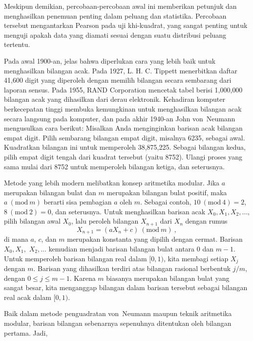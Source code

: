 Meskipun demikian, percobaan-percobaan awal ini memberikan petunjuk dan menghasilkan
penemuan penting dalam peluang dan statistika.  Percobaan tersebut mengantarkan Pearson pada \emx
{uji khi-kuadrat}, yang sangat penting untuk menguji apakah data
yang diamati sesuai dengan suatu distribusi peluang tertentu.

Pada awal 1900-an, jelas bahwa diperlukan cara yang lebih baik untuk menghasilkan bilangan acak.
Pada 1927, L. H. C. Tippett menerbitkan daftar 41{,}600 digit
yang diperoleh dengan memilih bilangan secara sembarang dari laporan sensus.  Pada 1955, RAND
Corporation mencetak tabel berisi 1{,}000{,}000 bilangan acak yang dihasilkan dari
derau elektronik.  Kehadiran komputer berkecepatan tinggi membuka
kemungkinan
untuk menghasilkan bilangan acak secara langsung pada komputer, dan pada akhir 1940-an
John von~Neumann mengusulkan cara berikut: Misalkan Anda menginginkan
barisan acak bilangan empat digit.  Pilih sembarang bilangan empat digit, misalnya
6235, sebagai awal.  Kuadratkan bilangan ini untuk memperoleh 38{,}875{,}225.  Sebagai bilangan
kedua, pilih empat digit tengah dari kuadrat tersebut (yaitu 8752).  Ulangi
proses yang sama mulai dari 8752 untuk memperoleh bilangan ketiga, dan seterusnya.  
\par
Metode yang lebih modern melibatkan
konsep aritmetika modular.  
Jika $a$ merupakan bilangan bulat dan $m$ merupakan bilangan bulat positif, maka
$a\ (\mbox{mod}\  m)$
berarti sisa pembagian $a$ oleh $m$.  Sebagai contoh, $10\ (
\mbox{mod}\  4) = 2$,
$8\ (\mbox{mod}\  2) = 0$, dan seterusnya.  Untuk menghasilkan barisan acak $X_0,
X_1, X_2,
\dots$, pilih bilangan awal $X_0$, lalu peroleh bilangan
$X_{n+1}$ dari $X_n$ dengan rumus 
$$X_{n+1} = (aX_n + c)\ (\mbox{mod}\ m)\ ,$$
di mana $a$, $c$, dan $m$ merupakan konstanta yang dipilih dengan cermat.  Barisan 
$ X_0,  X_1,$ 
$X_2, \dots$ 
kemudian menjadi barisan bilangan bulat antara 0 dan $m-1$.  Untuk memperoleh barisan bilangan real dalam $[0,1)$,
kita membagi setiap $X_j$ dengan $m$.  Barisan yang dihasilkan terdiri atas bilangan rasional berbentuk $j/m$,
dengan $0 \le j \le m-1$.  Karena $m$ biasanya merupakan bilangan bulat yang sangat besar, kita menganggap bilangan dalam barisan
tersebut sebagai bilangan real acak dalam $[0, 1)$.
\par
Baik dalam metode penguadratan von~Neumann maupun teknik aritmetika modular, barisan
bilangan sebenarnya sepenuhnya ditentukan oleh bilangan pertama.  Jadi,
